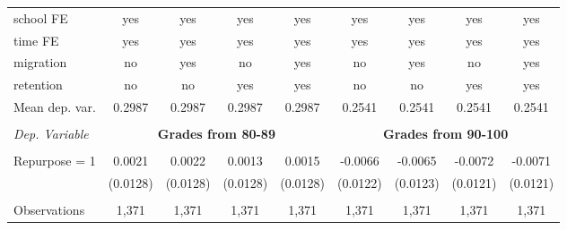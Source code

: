 \documentclass[12pt]{article}
\theoremstyle{plain}
\theoremstyle{plain}
\theoremstyle{plain}
\theoremstyle{definition}
\theoremstyle{plain}
\theoremstyle{definition}
\theoremstyle{plain}
\theoremstyle{remark}
\theoremstyle{definition}
\theoremstyle{definition}
\theoremstyle{plain}
\begin{document}
\begin{table}[H]
{\begin{tabular}{p{14.835em}llllllll}
			\multicolumn{1}{l}{school FE} & \multicolumn{1}{c}{yes} & \multicolumn{1}{c}{yes} & \multicolumn{1}{c}{yes} & \multicolumn{1}{c}{yes} & \multicolumn{1}{c}{yes} & \multicolumn{1}{c}{yes} & \multicolumn{1}{c}{yes} & \multicolumn{1}{c}{yes} \\
			\multicolumn{1}{l}{time FE} & \multicolumn{1}{c}{yes} & \multicolumn{1}{c}{yes} & \multicolumn{1}{c}{yes} & \multicolumn{1}{c}{yes} & \multicolumn{1}{c}{yes} & \multicolumn{1}{c}{yes} & \multicolumn{1}{c}{yes} & \multicolumn{1}{c}{yes} \\
			\multicolumn{1}{l}{migration} & \multicolumn{1}{c}{no} & \multicolumn{1}{c}{yes} & \multicolumn{1}{c}{no} & \multicolumn{1}{c}{yes} & \multicolumn{1}{c}{no} & \multicolumn{1}{c}{yes} & \multicolumn{1}{c}{no} & \multicolumn{1}{c}{yes} \\
			\multicolumn{1}{l}{retention} & \multicolumn{1}{c}{no} & \multicolumn{1}{c}{no} & \multicolumn{1}{c}{yes} & \multicolumn{1}{c}{yes} & \multicolumn{1}{c}{no} & \multicolumn{1}{c}{no} & \multicolumn{1}{c}{yes} & \multicolumn{1}{c}{yes} \\
			\multicolumn{1}{l}{Mean dep. var.} & \multicolumn{1}{c}{0.2987} & \multicolumn{1}{c}{0.2987} & \multicolumn{1}{c}{0.2987} & \multicolumn{1}{c}{0.2987} & \multicolumn{1}{c}{0.2541} & \multicolumn{1}{c}{0.2541} & \multicolumn{1}{c}{0.2541} & \multicolumn{1}{c}{0.2541} \\
			\midrule
			\multicolumn{1}{r}{} & & & & & & & & \\
			\midrule
			\multicolumn{1}{l}{\textit{Dep. Variable}} & \multicolumn{4}{c}{\textbf{Grades from 80-89}} & \multicolumn{4}{c}{\textbf{Grades from 90-100}} \\
			\midrule
			\multicolumn{1}{r}{} & & & & & & & & \\
			\multicolumn{1}{l}{Repurpose = 1} & \multicolumn{1}{c}{0.0021} & \multicolumn{1}{c}{0.0022} & \multicolumn{1}{c}{0.0013} & \multicolumn{1}{c}{0.0015} & \multicolumn{1}{c}{-0.0066} & \multicolumn{1}{c}{-0.0065} & \multicolumn{1}{c}{-0.0072} & \multicolumn{1}{c}{-0.0071} \\
			\multicolumn{1}{l}{} & \multicolumn{1}{c}{(0.0128)} & \multicolumn{1}{c}{(0.0128)} & \multicolumn{1}{c}{(0.0128)} & \multicolumn{1}{c}{(0.0128)} & \multicolumn{1}{c}{(0.0122)} & \multicolumn{1}{c}{(0.0123)} & \multicolumn{1}{c}{(0.0121)} & \multicolumn{1}{c}{(0.0121)} \\
			\multicolumn{1}{l}{} & & & & & & & & \\
			\multicolumn{1}{l}{Observations} & \multicolumn{1}{c}{1,371} & \multicolumn{1}{c}{1,371} & \multicolumn{1}{c}{1,371} & \multicolumn{1}{c}{1,371} & \multicolumn{1}{c}{1,371} & \multicolumn{1}{c}{1,371} & \multicolumn{1}{c}{1,371} & \multicolumn{1}{c}{1,371} \\

\end{tabular}}
\end{table}
\end{document}
